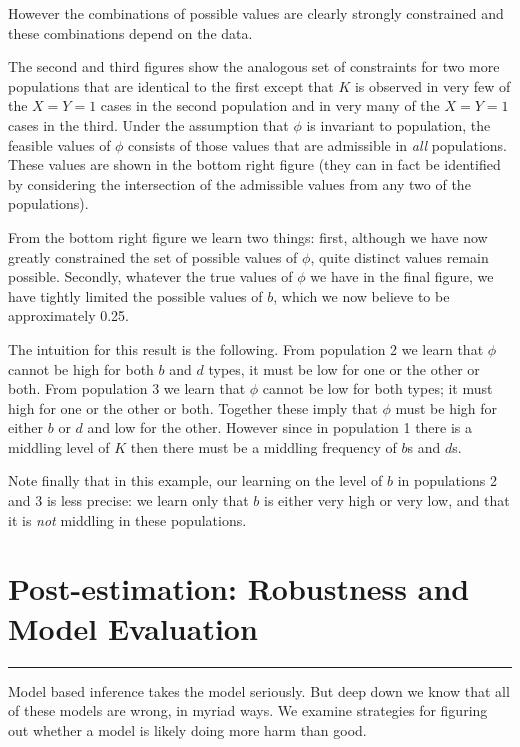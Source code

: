 \documentclass[12pt,]{book}
\begin{document}
However the combinations of possible values are clearly strongly constrained and these combinations depend on the data.

The second and third figures show the analogous set of constraints for two more populations that are identical to the first except that \(K\) is observed in very few of the \(X=Y=1\) cases in the second population and in very many of the \(X=Y=1\) cases in the third. Under the assumption that \(\phi\) is invariant to population, the feasible values of \(\phi\) consists of those values that are admissible in \emph{all} populations. These values are shown in the bottom right figure (they can in fact be identified by considering the intersection of the admissible values from any two of the populations).

From the bottom right figure we learn two things: first, although we have now greatly constrained the set of possible values of \(\phi\), quite distinct values remain possible. Secondly, whatever the true values of \(\phi\) we have in the final figure, we have tightly limited the possible values of \(b\), which we now believe to be approximately 0.25.

The intuition for this result is the following. From population 2 we learn that \(\phi\) cannot be high for both \(b\) and \(d\) types, it must be low for one or the other or both. From population 3 we learn that \(\phi\) cannot be low for both types; it must high for one or the other or both. Together these imply that \(\phi\) must be high for either \(b\) or \(d\) and low for the other. However since in population 1 there is a middling level of \(K\) then there must be a middling frequency of \(b\)s and \(d\)s.

Note finally that in this example, our learning on the level of \(b\) in populations 2 and 3 is less precise: we learn only that \(b\) is either very high or very low, and that it is \emph{not} middling in these populations.

\hypertarget{evaluation}{%
\chapter{Post-estimation: Robustness and Model Evaluation}\label{evaluation}}

\begin{center}\rule{0.5\linewidth}{\linethickness}\end{center}

Model based inference takes the model seriously. But deep down we know that all of these models are wrong, in myriad ways. We examine strategies for figuring out whether a model is likely doing more harm than good.
\end{document}
